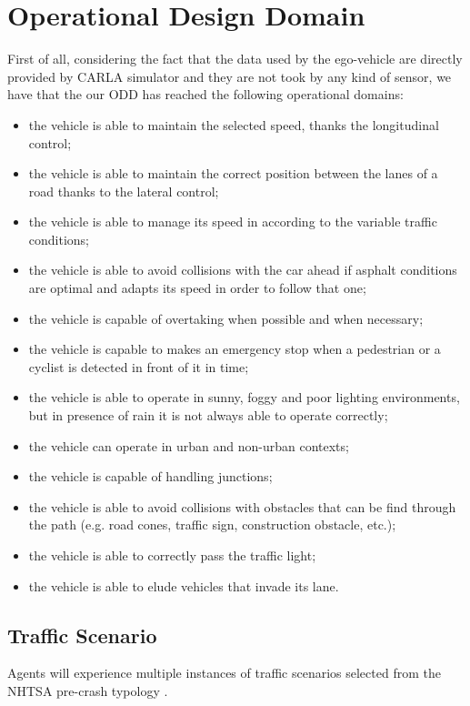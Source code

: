 \documentclass{article}
\begin{document}
\section{Operational Design Domain}
First of all, considering the fact that the data used by the ego-vehicle are directly provided by CARLA simulator and they are not took by any kind of sensor, we have 
that the our ODD has reached the following operational domains:
\begin{itemize}
    \item the vehicle is able to maintain the selected speed, thanks the longitudinal control;
    \item the vehicle is able to maintain the correct position between the lanes of a road thanks to the lateral control;
    \item the vehicle is able to manage its speed in according to the variable traffic conditions;
    \item the vehicle is able to avoid collisions with the car ahead if asphalt conditions are optimal and adapts its speed in order to follow that one;
    \item the vehicle is capable of overtaking when possible and when necessary;
    \item the vehicle is capable to makes an emergency stop when a pedestrian or a cyclist is detected in front of it in time;
    \item the vehicle is able to operate in sunny, foggy and poor lighting environments, but in presence of rain it is not always able to operate correctly;
    \item the vehicle can operate in urban and non-urban contexts;
    \item the vehicle is capable of handling junctions;
    \item the vehicle is able to avoid collisions with obstacles that can be find through the path (e.g. road cones, traffic sign, construction obstacle, etc.);
    \item the vehicle is able to correctly pass the traffic light;
    \item the vehicle is able to elude vehicles that invade its lane.
\end{itemize}

\subsection{Traffic Scenario}
Agents will experience multiple instances of traffic scenarios selected from the NHTSA pre-crash typology \cite{NHTSA}. 
\end{document}
